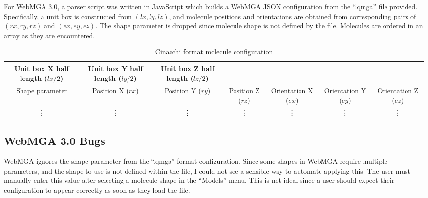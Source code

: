 For WebMGA 3.0, a parser script was written in JavaScript which builds a WebMGA JSON configuration from the ``.qmga'' file provided. Specifically, a unit box is constructed from $(lx, ly, lz)$, and molecule positions and orientations are obtained from corresponding pairs of $(rx,ry,rz)$ and $(ex,ey,ez)$. The shape parameter is dropped since molecule shape is not defined by the file. Molecules are ordered in an array as they are encountered.
\begin{table}
  \begin{center}
  \begin{adjustbox}{width=\textwidth}
    \begin{tabular}{|c|c|c|c|c|c|c|}
      \hline
       Unit box X half length ($lx/2$) & Unit box Y half length ($ly/2$) & Unit box Z half length ($lz/2$) & & & &\\
       \hline
       Shape parameter & Position X ($rx$) & Position Y ($ry$) & Position Z ($rz$) & Orientation X ($ex$) & Orientation Y ($ey$) & Orientation Z ($ez$)\\
       \hline
       \vdots & \vdots & \vdots & \vdots & \vdots & \vdots & \vdots \\
       \hline
    \end{tabular}
  \end{adjustbox}
  \end{center}
  \caption{Cinacchi format molecule configuration}
  \label{tab:cinacchi_format}
\end{table}

\subsection{WebMGA 3.0 Bugs}
WebMGA ignores the shape parameter from the ``.qmga'' format configuration. Since some shapes in WebMGA require multiple parameters, and the shape to use is not defined within the file, I could not see a sensible way to automate applying this. The user must manually enter this value after selecting a molecule shape in the ``Models'' menu. This is not ideal since a user should expect their configuration to appear correctly as soon as they load the file.
